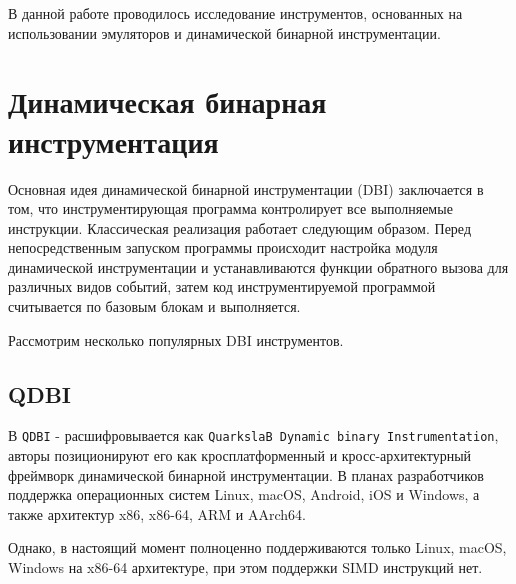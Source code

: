 В данной работе проводилось исследование инструментов, основанных на использовании эмуляторов и динамической бинарной инструментации.


\section{Динамическая бинарная инструментация}

Основная идея динамической бинарной инструментации (DBI) заключается в том, что инструментирующая программа контролирует все выполняемые инструкции. Классическая реализация работает следующим образом. Перед непосредственным запуском программы происходит настройка модуля динамической инструментации и устанавливаются функции обратного вызова для различных видов событий, затем код инструментируемой программой считывается по базовым блокам и выполняется.

Рассмотрим несколько популярных DBI инструментов.

\subsection{QDBI}

В \cite{QDBI} \texttt{QDBI} - расшифровывается как \texttt{QuarkslaB Dynamic binary Instrumentation}, авторы позиционируют его как кросплатформенный и кросс-архитектурный фреймворк динамической бинарной инструментации. В планах разработчиков поддержка операционных систем Linux, macOS, Android, iOS и Windows, а также архитектур  x86, x86-64, ARM и AArch64.

Однако, в настоящий момент полноценно поддерживаются только Linux, macOS, Windows на x86-64 архитектуре, при этом поддержки SIMD инструкций нет.

